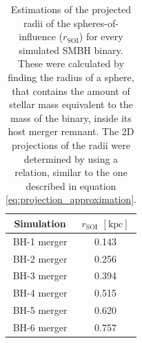 \documentclass[english, twoside]{HYgradu}
\begin{document}
\begin{table}
	\begin{center}
		\begin{tabular}{| c | c |}
		\hline
		Simulation & $r_\mathrm{SOI}$ $\mathrm{[kpc]}$ \\
		\hline
		BH-1 merger & 0.143 \\
		BH-2 merger & 0.256 \\
		BH-3 merger & 0.394 \\
		BH-4 merger & 0.515 \\
		BH-5 merger & 0.620 \\
		BH-6 merger & 0.757 \\
		\hline
		\end{tabular}
	\end{center}
	\caption{Estimations of the projected radii of the spheres-of-influence ($r_\mathrm{SOI}$) for every simulated SMBH binary. These were calculated by finding the radius of a sphere, that contains the amount of stellar mass equivalent to the mass of the binary, inside its host merger remnant. The 2D projections of the radii were determined by using a relation, similar to the one described in equation \ref{eq:projection_approximation}.}
	\label{table:s-o-i}
\end{table}
\end{document}
